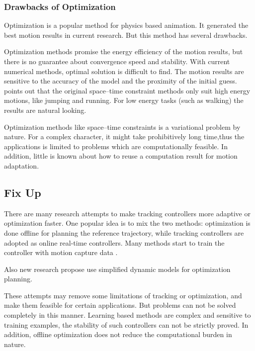\subsubsection*{Drawbacks of Optimization}
Optimization is a popular method for physics based animation.
It generated the best motion results in current research.
But this method has several drawbacks.

\begin{itemize}
Optimization methods promise the energy efficiency of the  motion results, but there is no guarantee about convergence speed and stability.
With current numerical methods, optimal solution is difficult to find. 
The motion results are sensitive to the accuracy of the model and the proximity of the initial guess.
\citet{Liu2005} points out that the original space–time constraint methods only suit high energy motions, like jumping and running.
For low energy tasks (such as walking) the results are natural looking.

Optimization methods like space–time constraints is a variational problem by nature. 
For a complex character, it might take  prohibitively long time,thus the applications is limited  to problems which are computationally feasible. 
In addition, little is known about how to reuse a computation result for motion adaptation.
\end{itemize}


\subsection{Fix Up}
There are many research attempts to make tracking controllers more adaptive or optimization faster.
One popular idea is to mix the two methods: optimization is done offline for planning the reference trajectory, while tracking controllers are adopted as online real-time controllers.
Many methods start to train the controller with motion capture data \citep{levine2011space,coros2010generalized,de2010feature,wei2011physically,ye2010optimal,lee2010motion,wang2010optimizing,wu2010terrain,liu2010sampling,lee2010data}. 

Also new research propose use simplified dynamic models for optimization planning\citep{mordatch2010robust}.


These attempts may remove some limitations of tracking or optimization, and make them feasible for certain applications.
But \cms problems can not be solved completely in this manner.
Learning based methods are complex and  sensitive to training examples, the stability of such controllers can not be strictly proved.
In addition,  offline optimization  does not reduce the computational burden in nature.





